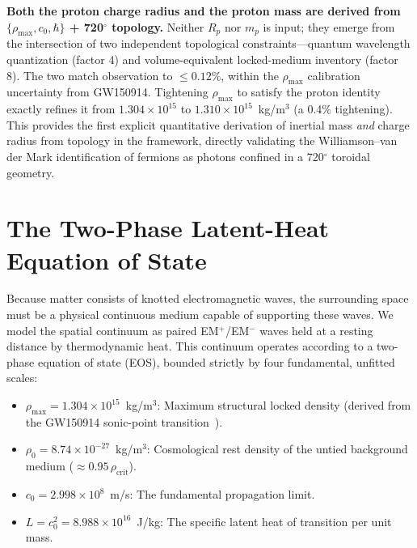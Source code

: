 \documentclass[aps,prd,twocolumn,superscriptaddress,amsmath,amssymb,nofootinbib,floatfix]{revtex4-2}
\newcommand{\rhomax}{\rho_{\max}}
\newcommand{\rhonaught}{\rho_{0}}
\newcommand{\cnaught}{c_{0}}
\begin{document}
\textbf{Both the proton charge radius and the proton mass are derived from $\{\rhomax, \cnaught, \hbar\}$ + 720$^{\circ}$ topology.} Neither $R_p$ nor $m_p$ is input; they emerge from the intersection of two independent topological constraints---quantum wavelength quantization (factor 4) and volume-equivalent locked-medium inventory (factor 8). The two match observation to $\le 0.12\%$, within the $\rhomax$ calibration uncertainty from GW150914. Tightening $\rhomax$ to satisfy the proton identity exactly refines it from $1.304 \times 10^{15}$ to $1.310 \times 10^{15}$~kg/m$^3$ (a 0.4\% tightening). This provides the first explicit quantitative derivation of inertial mass \emph{and} charge radius from topology in the framework, directly validating the Williamson--van der Mark identification of fermions as photons confined in a 720$^{\circ}$ toroidal geometry.

\section{The Two-Phase Latent-Heat Equation of State}
\label{sec:eos}

Because matter consists of knotted electromagnetic waves, the surrounding space must be a physical continuous medium capable of supporting these waves. We model the spatial continuum as paired EM$^{+}$/EM$^{-}$ waves held at a resting distance by thermodynamic heat. This continuum operates according to a two-phase equation of state (EOS), bounded strictly by four fundamental, unfitted scales:

\begin{itemize}
\item $\rhomax = 1.304 \times 10^{15}$~kg/m$^3$: Maximum structural locked density (derived from the GW150914 sonic-point transition~\cite{GW150914}).
\item $\rhonaught = 8.74 \times 10^{-27}$~kg/m$^3$: Cosmological rest density of the untied background medium ($\approx 0.95\,\rho_{\text{crit}}$).
\item $\cnaught = 2.998 \times 10^{8}$~m/s: The fundamental propagation limit.
\item $L = \cnaught^{2} = 8.988 \times 10^{16}$~J/kg: The specific latent heat of transition per unit mass.
\end{itemize}
\end{document}

